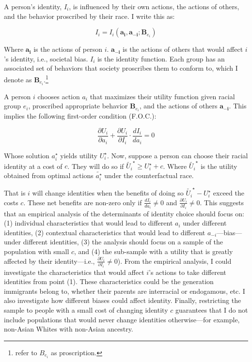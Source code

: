A person's identity, $I_i$, is influenced by their own actions, the actions of others, and the behavior proscribed by their race. I write this as:

\begin{equation}
I_i = I_i(\pmb{a_i}, \pmb{a_{-i}}; \pmb{B}_{e_{i}})\label{eq:identity}
\end{equation}

Where $\pmb{a_i}$ is the actions of person $i$. $\pmb{a_{-i}}$ is the actions of others that would affect $i$'s identity, i.e., societal bias. $I_i$ is the identity function. Each group has an associated set of behaviors that society proscribes them to conform to, which I denote as $\pmb{B}_{e_{i}}$.\footnote{\textcite{akerlofEconomicsIdentity2000} refer to $B_{e_{i}}$ as proscription.}

A person $i$ chooses action $a_i$ that maximizes their utility function given racial group $e_i$, proscribed appropriate behavior $\pmb{B}_{e_{i}}$, and the actions of others $\pmb{a_{-i}}$. This implies the following first-order condition (F.O.C.):

\begin{equation}
\frac{\partial U_i}{\partial a_i} + \frac{\partial U_i}{\partial I_i} \cdot \frac{d I_i}{d a_i} = 0\label{eq:foc}
\end{equation}

Whose solution $a_{i}^{\star}$ yields utility $U_{i}^{\star}$. Now, suppose a person can choose their racial identity at a cost of $c$. They will do so if $\tilde{U_{i}}^{\star} \geq  U_{i}^{\star} + c$. Where $\tilde{U_{i}}^{\star}$ is the utility obtained from optimal actions $\tilde{a_i^{\star}}$ under the counterfactual race. 

That is $i$ will change identities when the benefits of doing so $\tilde{U_{i}}^{\star} - U_{i}^{\star}$ exceed the costs $c$. These net benefits are non-zero only if $\frac{d I_i}{d a_i} \neq 0$ and $\frac{\partial U_i}{\partial I_i} \neq 0$. This suggests that an empirical analysis of the determinants of identity choice should focus on: (1) individual characteristics that would lead to different $a_i$ under different identities, (2) contextual characteristics that would lead to different $a_{-i}$---bias---under different identities, (3) the analysis should focus on a sample of the population with small $c$, and (4) the sub-sample with a utility that is greatly affected by their identity---i.e., $\frac{\partial U_i}{\partial I_i} \neq 0$). From the empirical analysis, I could investigate the characteristics that would affect $i$'s actions to take different identities from point (1). These characteristics could be the generation immigrants belong to, whether their parents are interracial or endogamous, etc. I also investigate how different biases could affect identity. Finally, restricting the sample to people with a small cost of changing identity $c$ guarantees that I do not include populations that would never change identities otherwise---for example, non-Asian Whites with non-Asian ancestry.

